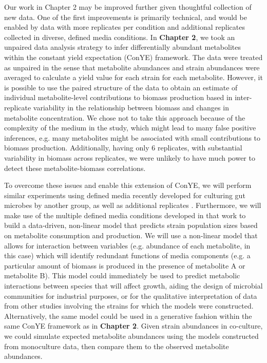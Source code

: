 \documentclass[11pt,twocolumn,notitlepage,openany,twoside]{book}
\begin{document}
\begin{refsection}
Our work in Chapter 2 may be improved further given thoughtful collection of new data. One of the first improvements is primarily technical, and would be enabled by data with more replicates per condition and additional replicates collected in diverse, defined media conditions. In \textbf{Chapter 2}, we took an unpaired data analysis strategy to infer differentially abundant metabolites within the constant yield expectation (ConYE) framework. The data were treated as unpaired in the sense that metabolite abundances and strain abundances were averaged to calculate a yield value for each strain for each metabolite. However, it is possible to use the paired structure of the data to obtain an estimate of individual metabolite-level contributions to biomass production based in inter-replicate variability in the relationship between biomass and changes in metabolite concentration. We chose not to take this approach because of the complexity of the medium in the study, which might lead to many false positive inferences, e.g. many metabolites might be associated with small contributions to biomass production. Additionally, having only 6 replicates, with substantial variability in biomass across replicates, we were unlikely to have much power to detect these metabolite-biomass correlations.

To overcome these issues and enable this extension of ConYE, we will perform similar experiments using defined media recently developed for culturing gut microbes by another group, as well as additional replicates \cite{Tramontano2018-xz}. Furthermore, we will make use of the multiple defined media conditions developed in that work to build a data-driven, non-linear model that predicts strain population sizes based on metabolite consumption and production. We will use a non-linear model that allows for interaction between variables (e.g. abundance of each metabolite, in this case) which will identify redundant functions of media components (e.g. a particular amount of biomass is produced in the presence of metabolite A or metabolite B). This model could immediately be used to predict metabolic interactions between species that will affect growth, aiding the design of microbial communities for industrial purposes, or for the qualitative interpretation of data from other studies involving the strains for which the models were constructed. Alternatively, the same model could be used in a generative fashion within the same ConYE framework as in \textbf{Chapter 2}. Given strain abundances in co-culture, we could simulate expected metabolite abundances using the models constructed from monoculture data, then compare them to the observed metabolite abundances.


\end{refsection}
\end{document}

